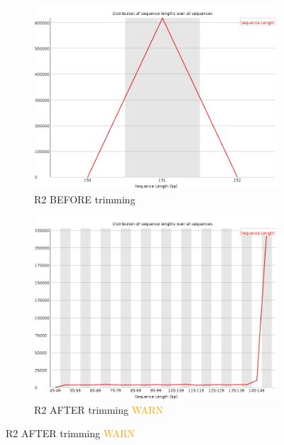 \documentclass{article}
\begin{document}
\begin{figure}[!htb]
\begin{subfigure}{0.45\linewidth}
\includegraphics[width=\linewidth]{04-D15-22373-HT-Nextera-Myeloid-Val1-Repeat_S4_L001_R2_001_fastqc/Images/sequence_length_distribution.png}
\caption{R2 BEFORE trimming}
\end{subfigure}
\begin{subfigure}{0.45\linewidth}
\includegraphics[width=\linewidth]{04-D15-22373-HT-Nextera-Myeloid-Val1-Repeat_S4_L001_R2_001.qfilter_fastqc/Images/sequence_length_distribution.png}
\caption{R2 AFTER trimming \textcolor{orange}{WARN}}
\end{subfigure}
\end{figure}
\end{document}
